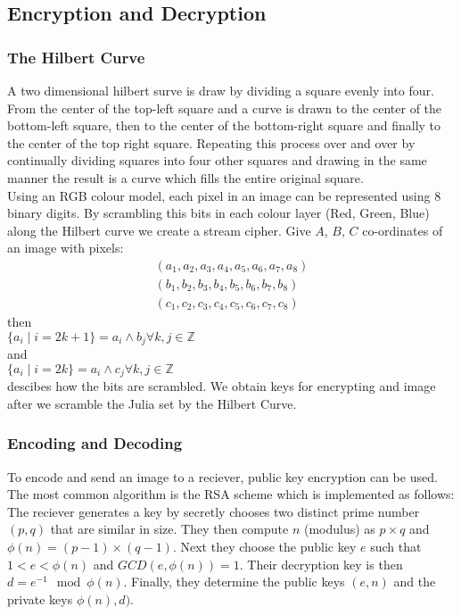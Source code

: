 \documentclass[12pt]{article}
\begin{document}
\subsection{Encryption and Decryption}
{\parindent0pt
\subsubsection{The Hilbert Curve}
A two dimensional hilbert surve is draw by dividing a square evenly into four. From the center of the top-left square and a curve is drawn to the center of the bottom-left square, then to the center of the bottom-right square and finally to the center of the top right square. \cite{algo} Repeating this process over and over by continually dividing squares into four other squares and drawing in the same manner the result is a curve which fills the entire original square. \\

Using an RGB colour model, each pixel in an image can be represented using 8 binary digits. By scrambling this bits in each colour layer (Red, Green, Blue) along the Hilbert curve we create a stream cipher. Give $A$, $B$, $C$ co-ordinates of an image with pixels:
\begin{align*}
 (a_1,a_2,a_3,a_4,a_5,a_6,a_7,a_8) \\
(b_1,b_2,b_3,b_4,b_5,b_6,b_7,b_8) \\
(c_1,c_2,c_3,c_4,c_5,c_6,c_7,c_8)
\end{align*}
then \\
$\{a_i  	\mid  i = 2k+1\}  = a_i \wedge b_j \forall k,j \in \mathbb{Z} $ \\
and \\
$\{a_i  	\mid  i = 2k\}  = a_i \wedge c_j \forall k,j \in \mathbb{Z} $ \\

descibes how the bits are scrambled. \cite{algo} We obtain keys for encrypting and image after we scramble the Julia set by the Hilbert Curve.

\subsubsection{Encoding and Decoding}
To encode and send an image to a reciever, public key encryption can be used. The most common algorithm is the RSA scheme which is implemented as follows:\cite{moham} \\

The reciever generates a key by secretly chooses two distinct prime number $(p,q)$ that are similar in size. They then compute $n$ (modulus) as $p \times q$ and $\phi (n) = (p-1)\times (q-1)$. Next they choose the public key $e$ such that $1 < e < \phi (n)$ and $GCD(e, \phi (n)) = 1$. Their decryption key is then $d = e^{-1} \mod \phi(n)$. Finally, they determine the public keys $(e,n)$ and the private keys $\phi (n), d)$.  \\

}
\end{document}
